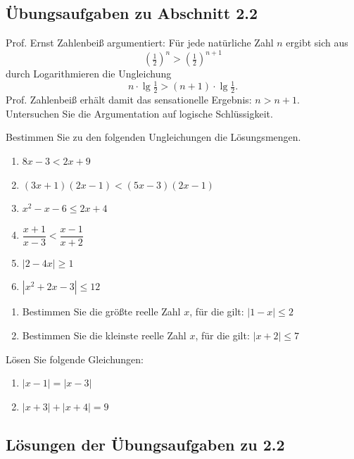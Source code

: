 \subsection{Übungsaufgaben zu Abschnitt 2.2}

\begin{uebungsaufgaben}
  \item Prof. Ernst Zahlenbeiß argumentiert: Für jede natürliche Zahl $n$ ergibt sich aus
    \[ \left(\tfrac{1}{2}\right)^n > \left(\tfrac{1}{2}\right)^{n+1} \]
    durch Logarithmieren die Ungleichung
    \[ n \cdot \lg \tfrac{1}{2} > (n+1) \cdot \lg \tfrac{1}{2} . \]
    Prof. Zahlenbeiß erhält damit das sensationelle Ergebnis: $n > n+1$.\\
    Untersuchen Sie die Argumentation auf logische Schlüssigkeit.
  \item Bestimmen Sie zu den folgenden Ungleichungen die Lösungsmengen.
    \begin{enumerate}[label=\alph*)]
      \item $8x - 3 < 2x + 9$
      \item $(3x+1)(2x-1) < (5x-3)(2x-1)$
      \item $x^2 - x - 6 \leq 2x + 4$
      \item $\dfrac{x+1}{x-3} < \dfrac{x-1}{x+2}$
      \item $\left|2 - 4x\right| \geq 1$
      \item $\left|x^2 + 2x - 3\right| \leq 12$
    \end{enumerate}
  \item \begin{enumerate}[label=\alph*)]
      \item Bestimmen Sie die größte reelle Zahl $x$, für die gilt: $\left|1 - x\right| \leq 2$
      \item Bestimmen Sie die kleinste reelle Zahl $x$, für die gilt: $\left|x + 2\right| \leq 7$
    \end{enumerate}
  \item Lösen Sie folgende Gleichungen:
    \begin{enumerate}[label=\alph*)]
      \item $\left|x - 1\right| = \left|x - 3\right|$
      \item $\left|x + 3\right| + \left|x + 4\right| = 9$
    \end{enumerate}
\end{uebungsaufgaben}

\subsection{Lösungen der Übungsaufgaben zu 2.2}

